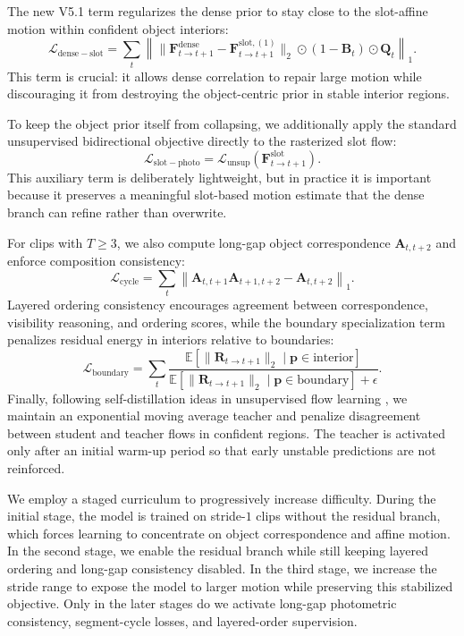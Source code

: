 The new V5.1 term regularizes the dense prior to stay close to the slot-affine motion within confident object interiors:
\begin{equation}
\mathcal{L}_{\mathrm{dense-slot}} = \sum_t \left\| \|\mathbf{F}^{\mathrm{dense}}_{t\rightarrow t+1} - \mathbf{F}^{\mathrm{slot},(1)}_{t\rightarrow t+1}\|_2 \odot (1-\mathbf{B}_t) \odot \mathbf{Q}_t \right\|_1.
\end{equation}
This term is crucial: it allows dense correlation to repair large motion while discouraging it from destroying the object-centric prior in stable interior regions.

To keep the object prior itself from collapsing, we additionally apply the standard unsupervised bidirectional objective directly to the rasterized slot flow:
\begin{equation}
\mathcal{L}_{\mathrm{slot-photo}} = \mathcal{L}_{\mathrm{unsup}}\!\left(\mathbf{F}^{\mathrm{slot}}_{t\rightarrow t+1}\right).
\end{equation}
This auxiliary term is deliberately lightweight, but in practice it is important because it preserves a meaningful slot-based motion estimate that the dense branch can refine rather than overwrite.

For clips with $T\geq 3$, we also compute long-gap object correspondence $\mathbf{A}_{t,t+2}$ and enforce composition consistency:
\begin{equation}
\mathcal{L}_{\mathrm{cycle}} = \sum_t \left\| \mathbf{A}_{t,t+1}\mathbf{A}_{t+1,t+2} - \mathbf{A}_{t,t+2} \right\|_1.
\end{equation}
Layered ordering consistency encourages agreement between correspondence, visibility reasoning, and ordering scores, while the boundary specialization term penalizes residual energy in interiors relative to boundaries:
\begin{equation}
\mathcal{L}_{\mathrm{boundary}} = \sum_t \frac{\mathbb{E}[\|\mathbf{R}_{t\rightarrow t+1}\|_2 \mid \mathbf{p}\in \mathrm{interior}]}{\mathbb{E}[\|\mathbf{R}_{t\rightarrow t+1}\|_2 \mid \mathbf{p}\in \mathrm{boundary}] + \epsilon}.
\end{equation}
Finally, following self-distillation ideas in unsupervised flow learning \cite{liu2019ddflow}, we maintain an exponential moving average teacher and penalize disagreement between student and teacher flows in confident regions. The teacher is activated only after an initial warm-up period so that early unstable predictions are not reinforced.

We employ a staged curriculum to progressively increase difficulty. During the initial stage, the model is trained on stride-$1$ clips without the residual branch, which forces learning to concentrate on object correspondence and affine motion. In the second stage, we enable the residual branch while still keeping layered ordering and long-gap consistency disabled. In the third stage, we increase the stride range to expose the model to larger motion while preserving this stabilized objective. Only in the later stages do we activate long-gap photometric consistency, segment-cycle losses, and layered-order supervision.

